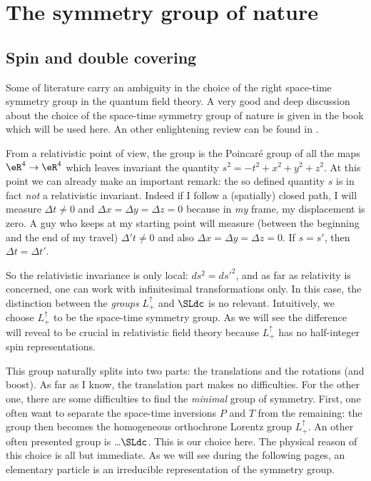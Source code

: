 \section{The symmetry group of nature}

\subsection{Spin and double covering}\label{subsec:sym_nature}

Some of literature carry an ambiguity in the choice of the right space-time symmetry group in the quantum field theory. A very good and deep discussion about the choice of the space-time symmetry group of nature is given in the book \cite{Naber} which will be used here. An other enlightening review can be found in \cite{ModavePoincarre}.

From a relativistic point of view, the group is the Poincaré group of all the maps $\eR^4\to\eR^4$ which leaves invariant the quantity $s^2=-t^2+x^2+y^2+z^2$.  At this point we can already make an important remark: the so defined quantity $s$ is in fact \emph{not} a relativistic invariant. Indeed if I follow a (spatially) closed path, I will measure $\Delta t\neq 0$ and $\Delta x=\Delta y=\Delta z=0$ because in \emph{my} frame, my displacement is zero. A guy who keeps at my starting point will measure (between the beginning and the end of my travel) $\Delta 't\neq 0$ and also $\Delta x=\Delta y=\Delta z=0$. If $s=s'$, then $\Delta t=\Delta t'$.

So the relativistic invariance is only local: $ds^2=ds'^2$, and as far as relativity is concerned, one can work with infinitesimal transformations only. In this case, the distinction between the \emph{groups} $L_+^{\uparrow}$ and $\SLdc$ is no relevant. Intuitively, we choose $L_+^{\uparrow}$ to be the space-time symmetry group. As we will see the difference will reveal to be crucial in relativistic field theory because $L_+^{\uparrow}$ has no half-integer spin representations.

This group naturally splits into two parts: the translations and the rotations (and boost). As far as I know, the translation part makes no difficulties. For the other one, there are some difficulties to find the \emph{minimal} group of symmetry. First, one often want to separate the space-time inversions $P$ and $T$ from the remaining: the group then becomes the homogeneous orthochrone Lorentz group $L_+^{\uparrow}$. An other often presented group is \ldots $\SLdc$. This is our choice here. The physical reason of this choice is all but immediate. As we will see during the following pages, an elementary particle is an irreducible representation of the symmetry group.

